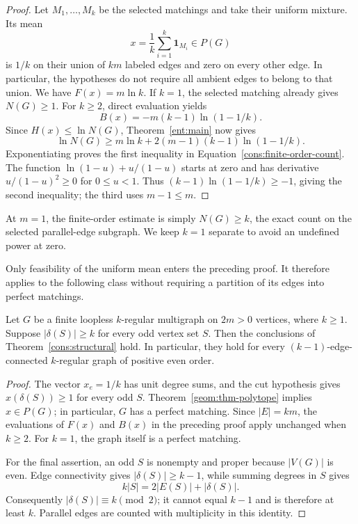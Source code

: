 \begin{proof}
Let \(M_1,\ldots,M_k\) be the selected matchings and take their
uniform mixture. Its mean
\[
                 x=\frac1k\sum_{i=1}^k\mathbf1_{M_i}\in P(G)
\]
is \(1/k\) on their union of \(km\) labeled edges and zero on every
other edge. In particular, the hypotheses do not require all ambient
edges to belong to that union. We have \(F(x)=m\ln k\).
If \(k=1\), the selected matching already gives \(N(G)\ge1\).
For \(k\ge2\), direct evaluation yields
\[
                 B(x)=-m(k-1)\ln(1-1/k).
\]
Since \(H(x)\le\ln N(G)\), Theorem~\ref{ent:main} now gives
\[
 \ln N(G)\ge m\ln k+2(m-1)(k-1)\ln(1-1/k).
\]
Exponentiating proves the first inequality in
Equation~\eqref{cons:finite-order-count}.
The function \(\ln(1-u)+u/(1-u)\) starts at zero and has derivative
\(u/(1-u)^2\ge0\) for \(0\le u<1\). Thus
\((k-1)\ln(1-1/k)\ge-1\), giving the second inequality; the third
uses \(m-1\le m\).
\end{proof}

At \(m=1\), the finite-order estimate is simply
\(N(G)\ge k\), the exact count on the selected parallel-edge subgraph.
We keep \(k=1\) separate to avoid an undefined power at zero.

Only feasibility of the uniform mean enters the preceding proof. It
therefore applies to the following class without requiring a partition
of its edges into perfect matchings.

\begin{corollary}
\label{cons:regular}
Let \(G\) be a finite loopless \(k\)-regular multigraph on \(2m>0\)
vertices, where \(k\ge1\). Suppose
\(\lvert\delta(S)\rvert\ge k\) for every odd vertex set \(S\).
Then the conclusions of Theorem~\ref{cons:structural} hold.
In particular, they hold for every \((k-1)\)-edge-connected
\(k\)-regular graph of positive even order.
\end{corollary}

\begin{proof}
The vector \(x_e=1/k\) has unit degree sums, and the cut hypothesis
gives \(x(\delta(S))\ge1\) for every odd \(S\).
Theorem~\ref{geom:thm-polytope} implies \(x\in P(G)\); in particular,
\(G\) has a perfect matching. Since \(|E|=km\), the evaluations of
\(F(x)\) and \(B(x)\) in the preceding proof apply unchanged when
\(k\ge2\). For \(k=1\), the graph itself is a perfect matching.

For the final assertion, an odd \(S\) is nonempty and proper because
\(|V(G)|\) is even. Edge connectivity gives
\(\lvert\delta(S)\rvert\ge k-1\), while summing degrees in \(S\)
gives
\[
            k|S|=2|E(S)|+|\delta(S)|.
\]
Consequently \(|\delta(S)|\equiv k\pmod2\); it cannot equal \(k-1\)
and is therefore at least \(k\). Parallel edges are counted with
multiplicity in this identity.
\end{proof}

